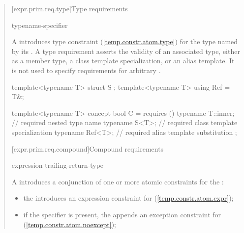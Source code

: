 \begin{quote}
[expr.prim.req.type]{Type requirements}

\begin{bnf}
\br
    typename-specifier \terminal{;}
\end{bnf}

\pnum
A  introduces type 
constraint (\ref{temp.constr.atom.type}) for the type named by its
.
%
\enternote
A type requirement asserts the validity of an associated
type, either as a member type, a class template specialization,
or an alias template. It is not used to specify requirements for
arbitrary .
\exitnote
%
\enterexample
\begin{codeblock}
template<typename T> struct S { };
template<typename T> using Ref = T&;

template<typename T> concept bool C =
  requires () {
    typename T::inner; // required nested type name
    typename S<T>;     // required class template specialization
    typename Ref<T>;   // required alias template substitution
  };
\end{codeblock}
\exitexample


[expr.prim.req.compound]{Compound requirements}
      
\begin{bnf}
\br
  \terminal{\{} expression \terminal{\}} \opt 
    trailing-return-type\opt~\terminal{;}
\end{bnf}

\pnum
A  introduces 
a conjunction of one or more atomic constraints for the
 :
%
\begin{itemize}
\item the  introduces an expression 
constraint for  (\ref{temp.constr.atom.expr});

\item if the  specifier is present, the 
 appends an exception constraint for 
 (\ref{temp.constr.atom.noexcept});


\end{itemize}
\end{quote}

